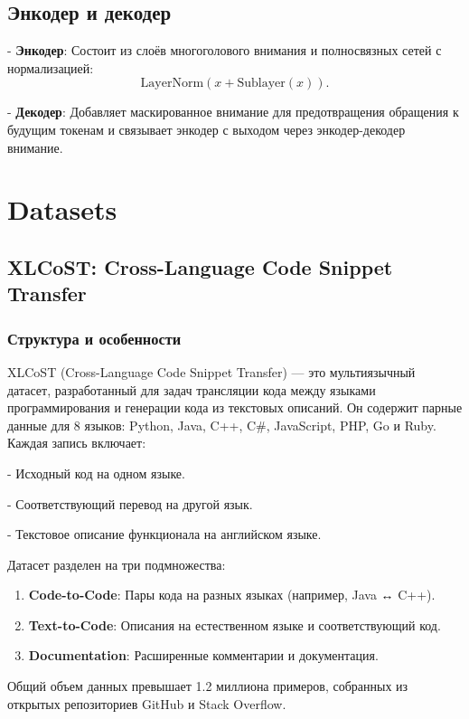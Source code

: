 \documentclass[14pt]{article}
\theoremstyle{definition}
\begin{document}
\subsection{Энкодер и декодер}

    
- \textbf{Энкодер}: Состоит из слоёв многоголового внимания и полносвязных сетей с нормализацией:
    \[
    \text{LayerNorm}(x + \text{Sublayer}(x)).
    \]
    
- \textbf{Декодер}: Добавляет маскированное внимание для предотвращения обращения к будущим токенам и связывает энкодер с выходом через энкодер-декодер внимание.

\newpage
\section{Datasets}
\subsection{XLCoST: Cross-Language Code Snippet Transfer}

\subsubsection{Структура и особенности}
XLCoST (Cross-Language Code Snippet Transfer) — это мультиязычный датасет, разработанный для задач трансляции кода между языками программирования и генерации кода из текстовых описаний. Он содержит парные данные для 8 языков: Python, Java, C++, C\#, JavaScript, PHP, Go и Ruby. Каждая запись включает:

    
- Исходный код на одном языке.
    
- Соответствующий перевод на другой язык.
    
- Текстовое описание функционала на английском языке.


Датасет разделен на три подмножества:
\begin{enumerate}
    \item \textbf{Code-to-Code}: Пары кода на разных языках (например, Java ↔ C++).
    \item \textbf{Text-to-Code}: Описания на естественном языке и соответствующий код.
    \item \textbf{Documentation}: Расширенные комментарии и документация.
\end{enumerate}

Общий объем данных превышает 1.2 миллиона примеров, собранных из открытых репозиториев GitHub и Stack Overflow.
\end{document}
